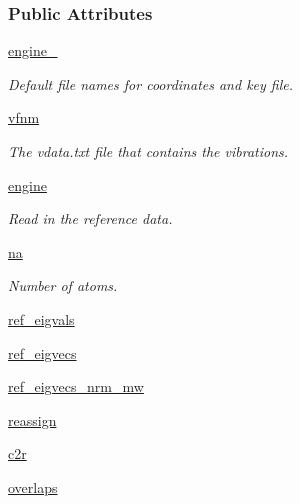 \subsubsection*{Public Attributes}
\begin{DoxyCompactItemize}
\item 
\hyperlink{classforcebalance_1_1tinkerio_1_1Vibration__TINKER_a58147b138c8beb01d4f9e10b0d2394b1}{engine\-\_\-}
\begin{DoxyCompactList}\small\item\em Default file names for coordinates and key file. \end{DoxyCompactList}\item 
\hyperlink{classforcebalance_1_1vibration_1_1Vibration_a50552dbdadc7a86aaab97bfdcf85e449}{vfnm}
\begin{DoxyCompactList}\small\item\em The vdata.\-txt file that contains the vibrations. \end{DoxyCompactList}\item 
\hyperlink{classforcebalance_1_1vibration_1_1Vibration_ad72d6182d9f2d2a1ba97030635fbdb3d}{engine}
\begin{DoxyCompactList}\small\item\em Read in the reference data. \end{DoxyCompactList}\item 
\hyperlink{classforcebalance_1_1vibration_1_1Vibration_a31148c4d3157dddf2485c4e63496e120}{na}
\begin{DoxyCompactList}\small\item\em Number of atoms. \end{DoxyCompactList}\item 
\hyperlink{classforcebalance_1_1vibration_1_1Vibration_ab9913cb05e66e53a5781237baf9ea2e1}{ref\-\_\-eigvals}
\item 
\hyperlink{classforcebalance_1_1vibration_1_1Vibration_ae9c5479bd3b01ecb3d2d40a9487ccac5}{ref\-\_\-eigvecs}
\item 
\hyperlink{classforcebalance_1_1vibration_1_1Vibration_a6b2b9f1e95bea0edabd46ada819cd005}{ref\-\_\-eigvecs\-\_\-nrm\-\_\-mw}
\item 
\hyperlink{classforcebalance_1_1vibration_1_1Vibration_a6dc3e340d09d4adc415eee905c75b6cc}{reassign}
\item 
\hyperlink{classforcebalance_1_1vibration_1_1Vibration_aadf038fadc7a0d1ca03ba225ebf7edb6}{c2r}
\item 
\hyperlink{classforcebalance_1_1vibration_1_1Vibration_a9ce45d9b33c510d6c1bc78f5f09b1981}{overlaps}

\end{DoxyCompactItemize}
